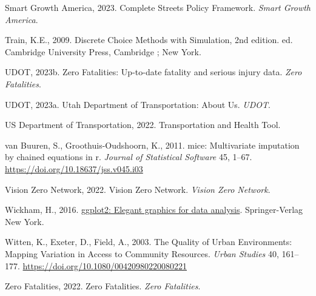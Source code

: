 \documentclass[
  letterpaper,
  DIV=11,
  numbers=noendperiod]{scrreport}
\newlength{\cslhangindent}
\newlength{\cslentryspacingunit} %
\newenvironment{CSLReferences}[2] %
 {%
  \setlength{\parindent}{0pt}
  \ifodd #1
  \let\oldpar\par
  \def\par{\hangindent=\cslhangindent\oldpar}
  \fi
  \setlength{\parskip}{#2\cslentryspacingunit}
 }%
 {}
\begin{document}
\begin{CSLReferences}{1}{0}
\leavevmode{}%
Smart Growth America, 2023. Complete {Streets Policy Framework}.
\emph{Smart Growth America}.

\leavevmode{}%
Train, K.E., 2009. Discrete {Choice Methods} with {Simulation}, 2nd
edition. ed. {Cambridge University Press}, {Cambridge ; New York}.

\leavevmode{}%
UDOT, 2023b. Zero {Fatalities}: {Up-to-date} fatality and serious injury
data. \emph{Zero Fatalities}.

\leavevmode{}%
UDOT, 2023a. Utah {Department} of {Transportation}: {About Us}.
\emph{UDOT}.

\leavevmode{}%
US Department of Transportation, 2022. Transportation and {Health Tool}.

\leavevmode{}%
van Buuren, S., Groothuis-Oudshoorn, K., 2011. {mice}: Multivariate
imputation by chained equations in r. \emph{Journal of Statistical
Software} 45, 1--67. \url{https://doi.org/10.18637/jss.v045.i03}

\leavevmode{}%
Vision Zero Network, 2022. Vision {Zero Network}. \emph{Vision Zero
Network}.

\leavevmode{}%
Wickham, H., 2016. \href{https://ggplot2.tidyverse.org}{ggplot2: Elegant
graphics for data analysis}. Springer-Verlag New York.

\leavevmode{}%
Witten, K., Exeter, D., Field, A., 2003. The {Quality} of {Urban
Environments}: {Mapping Variation} in {Access} to {Community Resources}.
\emph{Urban Studies} 40, 161--177.
\url{https://doi.org/10.1080/00420980220080221}

\leavevmode{}%
Zero Fatalities, 2022. Zero {Fatalities}. \emph{Zero Fatalities}.

\end{CSLReferences}
\end{document}
